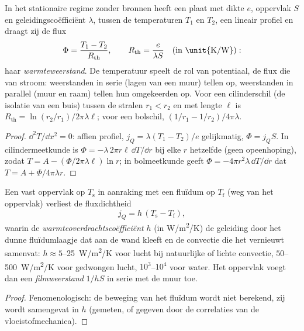 \begin{proposition}\label{prop:b2:heat-conduction:resistance}
In het stationaire regime zonder bronnen heeft een plaat met dikte $e$,
oppervlak $S$ en geleidingscoëfficiënt $\lambda$, tussen de temperaturen $T_1$ en
$T_2$, een lineair profiel en draagt zij de flux
\[
\Phi = \frac{T_1 - T_2}{R_{\text{th}}}, \qquad
R_{\text{th}} = \frac{e}{\lambda S}\quad\text{(in \unit{K/W})} :
\]
haar \emph{warmteweerstand}. De temperatuur
speelt de rol van potentiaal, de flux die van stroom: weerstanden in
serie (lagen van een muur) tellen op, weerstanden in parallel (muur en
raam) tellen hun omgekeerden op. Voor een cilinderschil (de isolatie
van een buis) tussen de stralen $r_1 < r_2$ en met lengte $\ell$ is
$R_{\text{th}} = \ln(r_2/r_1)/2\pi\lambda\ell$; voor een bolschil,
$(1/r_1 - 1/r_2)/4\pi\lambda$.
\end{proposition}

\begin{proof}
$\dd^2T/\dd x^2 = 0$: affien profiel, $j_Q = \lambda(T_1 - T_2)/e$
gelijkmatig, $\Phi = j_QS$. In cilindermeetkunde is
$\Phi = -\lambda\,2\pi
r\ell\,\dd T/\dd r$ bij elke $r$ hetzelfde (geen
opeenhoping), zodat
$T = A - (\Phi/2\pi\lambda\ell)\ln r$; in bolmeetkunde geeft
$\Phi =
-4\pi r^2\lambda\,\dd T/\dd r$ dat $T = A + \Phi/4\pi\lambda r$.
\end{proof}

\begin{proposition}\label{prop:b2:heat-conduction:newton}
Een vast oppervlak op $T_{\text{s}}$ in aanraking met een fluïdum op $T_{\text{f}}$
(weg van het oppervlak) verliest de fluxdichtheid
\[
j_Q = h\,(T_{\text{s}} - T_{\text{f}}) ,
\]
waarin de \emph{warmteoverdrachtscoëfficiënt} $h$ (in \unit{W/m^2/K}) de geleiding door
het dunne fluïdumlaagje dat aan de wand kleeft en de convectie die het
vernieuwt samenvat: $h \approx 5$--\qty{25}{W/m^2/K} voor lucht bij natuurlijke of
lichte convectie, $50$--\qty{500}{W/m^2/K} voor gedwongen lucht, $10^3$--$10^4$
voor water. Het oppervlak voegt dan een \emph{filmweerstand} $1/hS$ in
serie met de muur toe.
\end{proposition}

\begin{proof}
Fenomenologisch: de beweging van het fluïdum wordt niet berekend, zij wordt
samengevat
in $h$ (gemeten, of gegeven door de correlaties van de vloeistofmechanica).
\end{proof}

